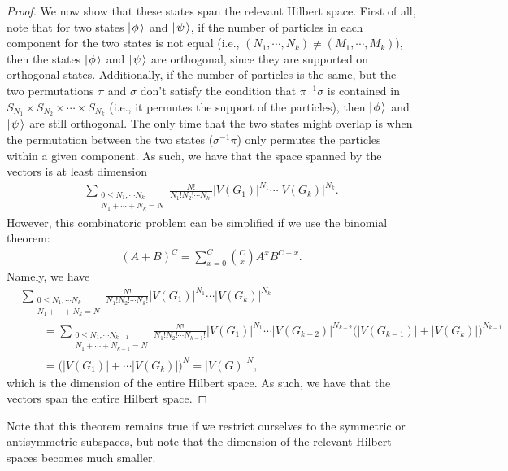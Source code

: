\documentclass[../thesis-main/thesis-main]{subfiles}
\begin{document}
\begin{proof}
We now show that these states span the relevant Hilbert space.  First of all, note that for two states $|\mspace{2mu} \phi \mspace{2mu} \rangle$ and $|\mspace{2mu} \psi \mspace{2mu} \rangle$, if the number of particles in each component for the two states is not equal (i.e., $(N_1,\cdots, N_k)\neq (M_1,\cdots, M_k)$), then the states $|\mspace{2mu} \phi \mspace{2mu} \rangle$ and $|\mspace{2mu} \psi \mspace{2mu} \rangle$ are orthogonal, since they are supported on orthogonal states.  Additionally, if the number of particles is the same, but the two permutations $\pi$ and $\sigma$ don't satisfy the condition that $\pi^{-1}\sigma$ is contained in $S_{N_1} \times S_{N_2}\times\cdots \times S_{N_k}$ (i.e., it permutes the support of the particles), then $|\mspace{2mu} \phi \mspace{2mu} \rangle$ and $|\mspace{2mu} \psi \mspace{2mu} \rangle$ are still orthogonal.  The only time that the two states might overlap is when the permutation between the two states ($\sigma^{-1}\pi$) only permutes the particles within a given component.  As such, we have that the space spanned by the vectors  is at least dimension
\begin{align}
  \sum_{\substack{0\leq N_1,\cdots N_k\\N_1+\cdots+N_k = N}} \frac{N!}{N_1! N_2! \cdots N_k!} |V(G_1)|^{N_1} \cdots |V(G_k)|^{N_k}.
\end{align}
However, this combinatoric problem can be simplified if we use the binomial theorem:
\begin{align}
  (A+B)^C = \sum_{x=0}^C \binom{C}{x} A^xB^{C-x}.
\end{align}
Namely, we have
\begin{align}
  &\sum_{\substack{0\leq N_1,\cdots N_k\\N_1+\cdots+N_k = N}} \frac{N!}{N_1! N_2! \cdots N_k!} |V(G_1)|^{N_1} \cdots |V(G_k)|^{N_k}\nonumber\\
  &\qquad  = \sum_{\substack{0\leq N_1,\cdots N_{k-1}\\N_1+\cdots+N_{k-1} = N}} \frac{N!}{N_1! N_2! \cdots N_{k-1}!} |V(G_1)|^{N_1} \cdots |V(G_{k-2})|^{N_{k-2}} \big(|V(G_{k-1})| + |V(G_{k})| \big)^{N_{k-1}}\\
  &\qquad = \Big(|V(G_1)| + \cdots |V(G_k)|\big)^{N} = |V(G)|^N,
\end{align}
which is the dimension of the entire Hilbert space.  As such, we have that the vectors  span the entire Hilbert space.
\end{proof}

Note that this theorem remains true if we restrict ourselves to the symmetric or antisymmetric subspaces, but note that the dimension of the relevant Hilbert spaces becomes much smaller.
\end{document}
